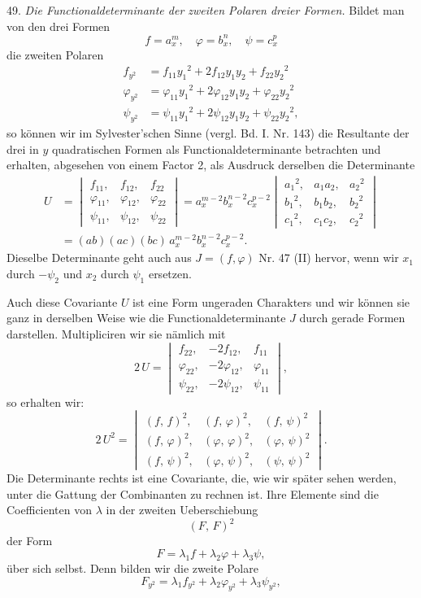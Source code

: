 \documentclass[11pt]{article}
\providecommand{\weq}[2]{\begin{equation}\tag{#1}#2\end{equation}}
\begin{document}
49. \textit{Die Functionaldeterminante der zweiten Polaren dreier Formen.} Bildet man von den drei Formen
\[
f = a_x^m, \quad \varphi = b_x^n, \quad \psi = c_x^p
\]
die zweiten Polaren
\[
\begin{aligned}
f_{y^2} &= f_{11}y_1{}^2 + 2f_{12}y_1y_2 + f_{22}y_2{}^2 \\
\varphi_{y^2} &= \varphi_{11}y_1{}^2 + 2\varphi_{12}y_1y_2 + \varphi_{22}y_2{}^2 \\
\psi_{y^2} &= \psi_{11}y_1{}^2 + 2\psi_{12}y_1y_2 + \psi_{22}y_2{}^2,
\end{aligned}
\]
so können wir im Sylvester'schen Sinne (vergl. Bd. I. Nr. 143) die Resultante der drei in $y$ quadratischen Formen als Functionaldeterminante betrachten und erhalten, abgesehen von einem Factor 2, als Ausdruck derselben die Determinante
\weq{I}{
\begin{aligned}
U &= \begin{vmatrix} f_{11}, & f_{12}, & f_{22} \\ \varphi_{11}, & \varphi_{12}, & \varphi_{22} \\ \psi_{11}, & \psi_{12}, & \psi_{22} \end{vmatrix}
= a_x^{m-2}b_x^{n-2}c_x^{p-2} \begin{vmatrix} a_1{}^2, & a_1a_2, & a_2{}^2 \\ b_1{}^2, & b_1b_2, & b_2{}^2 \\ c_1{}^2, & c_1c_2, & c_2{}^2 \end{vmatrix} \\
&= (ab)(ac)(bc)\,a_x^{m-2}b_x^{n-2}c_x^{p-2}.
\end{aligned}
}
Dieselbe Determinante geht auch aus $J = (f, \varphi)$ Nr. 47 (II) hervor, wenn wir $x_1$ durch $-\psi_2$ und $x_2$ durch $\psi_1$ ersetzen.

Auch diese Covariante $U$ ist eine Form ungeraden Charakters und wir können sie ganz in derselben Weise wie die Functionaldeterminante $J$ durch gerade Formen darstellen. Multipliciren wir sie nämlich mit
\[
2\,U = \begin{vmatrix} f_{22}, & -2f_{12}, & f_{11} \\ \varphi_{22}, & -2\varphi_{12}, & \varphi_{11} \\ \psi_{22}, & -2\psi_{12}, & \psi_{11} \end{vmatrix},
\]
so erhalten wir:
\weq{II}{
2\,U^2 = \begin{vmatrix} (f,\,f)^2, & (f,\,\varphi)^2, & (f,\,\psi)^2 \\ (f,\,\varphi)^2, & (\varphi,\,\varphi)^2, & (\varphi,\,\psi)^2 \\ (f,\,\psi)^2, & (\varphi,\,\psi)^2, & (\psi,\,\psi)^2 \end{vmatrix}.
}
Die Determinante rechts ist eine Covariante, die, wie wir später sehen werden, unter die Gattung der Combinanten zu rechnen ist. Ihre Elemente sind die Coefficienten von $\lambda$ in der zweiten Ueberschiebung
\[
(F,\,F)^2
\]
der Form
\[
F = \lambda_1 f + \lambda_2 \varphi + \lambda_3 \psi,
\]
über sich selbst. Denn bilden wir die zweite Polare
\[
F_{y^2} = \lambda_1 f_{y^2} + \lambda_2 \varphi_{y^2} + \lambda_3 \psi_{y^2},
\]
\end{document}
